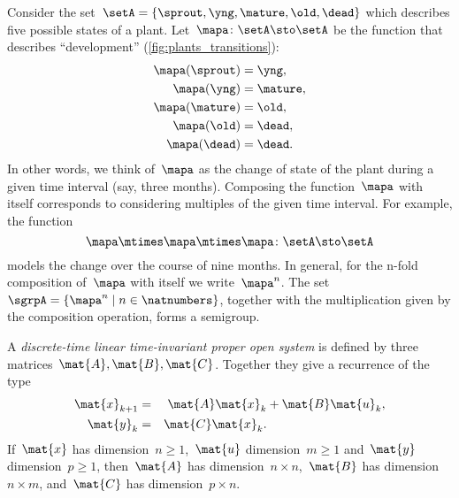 \begin{example}
	\label{exa:plant-trafo-semigroup}
	Consider the set~$\setA = \{ \sprout, \yng, \mature, \old, \dead \}$ which describes five possible states of a plant.
	Let~$\mapa \colon \setA \sto \setA$ be the function that describes ``development'' (\cref{fig:plants_transitions}):
	\begin{align*}
		\mapa(\sprout) & =  \yng,    \\
		\mapa(\yng)    & =  \mature, \\
		\mapa(\mature) & =  \old,    \\
		\mapa( \old)   & = \dead,    \\
		\mapa (\dead)  & = \dead.
	\end{align*}
	In other words, we think of~$\mapa$ as the change of state of the plant during a given time interval (say, three months).
	Composing the function~$\mapa$ with itself corresponds to considering multiples of the given time interval.
	For example, the function
	\begin{equation*}
		\mapa \mtimes \mapa \mtimes \mapa \colon \setA \sto \setA
	\end{equation*}
	models the change over the course of nine months.
	In general, for the n-fold composition of~$\mapa$ with itself we write~$\mapa^n$.
	The set~$\sgrpA = \{ \mapa^n \mid n \in \natnumbers \}$, together with the multiplication given by the composition operation, forms a semigroup.
\end{example}

\begin{definition}
	\label{ex:discrete-time-linear}
	\label{def:discrete-time-linear-system}
	A \emph{discrete-time linear time-invariant proper open system} is defined by three matrices~$\mat{A},\mat{B},\mat{C}$.
	Together they give a recurrence of the type
	\begin{equation}
		\label{eq:discrete-time-dynamics}
		\begin{aligned}
			\mat{x}_{k+1} & = & \mat{A} \mat{x}_k  & + \mat{B} \mat{u}_k, \\
			\mat{y}_{k}   & = & \mat{C} \mat{x}_k.
			\\
		\end{aligned}
	\end{equation}
	If~$\mat{x}$ has dimension~$n\geq1$,~$\mat{u}$ dimension~$m\geq1$ and~$\mat{y}$ dimension~$p\geq1$, then~$\mat{A}$ has dimension~$n \times n$,~$\mat{B}$ has dimension~$n \times m$, and~$\mat{C}$ has dimension~$p \times n$.
\end{definition}

